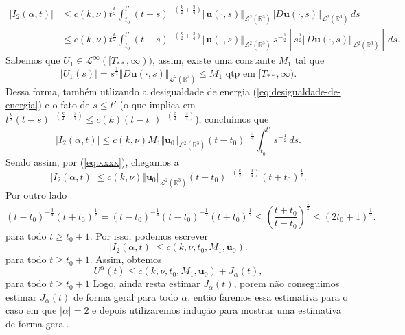 \documentclass[a4paper, 11pt]{book}
\theoremstyle{definition}
\newcommand{\bR}{\mathbb{R}}
\newcommand{\bu}{\mathbf{u}}
\newcommand{\cL}{\mathcal{L}}
\begin{document}
\begin{prf}
    \[
        \begin{aligned}
            |I_2(\alpha,t)| &\leqslant c(k,\nu) t^{\frac{k}{2}} \! \int_{t_0}^{t'} (t-s)^{-\left( \frac{k}{2} + \frac{3}{4} \right)} \Vert \bu(\cdot,s) \Vert_{\cL^2(\bR^3)} \Vert D\bu(\cdot,s) \Vert_{\cL^2(\bR^3)} \,ds\\
            &\leqslant c(k,\nu)t^{\frac{k}{2}} \!\int_{t_0}^{t'} (t-s)^{-\left( \frac{k}{2} + \frac{3}{4} \right)} \Vert \bu(\cdot,s) \Vert_{\cL^2(\bR^3)} \, s^{-\frac{1}{2}} \left[ s^{\frac{1}{2}} \Vert D\bu(\cdot,s) \Vert_{\cL^2(\bR^3)} \right] \,ds.
        \end{aligned}
    \]
    Sabemos que $U_1 \in \cL^\infty([T_{**},\infty))$, assim, existe uma constante $M_1$ tal que
    \begin{equation} \label{eq:C1}
        |U_1(s)| = s^{\frac{1}{2}} \Vert D\bu(\cdot,s) \Vert_{\cL^2(\bR^3)} \leqslant M_1 \text{ qtp em } [T_{**},\infty).
    \end{equation}
    Dessa forma, também utlizando a desigualdade de energia (\ref{eq:desigualdade-de-energia}) e o fato de $s \leqslant t'$ (o que implica em $t^{\frac{k}{2}}(t-s)^{-\left( \frac{k}{2} + \frac{3}{4} \right)} \leqslant c(k)(t-t_0)^{-\left( \frac{k}{2} + \frac{3}{4} \right)}$), concluímos que
    \[
        |I_2(\alpha,t)|\leqslant c(k,\nu) M_1 \Vert \bu_0 \Vert_{\cL^2(\bR^3)} (t-t_0)^{-\frac{3}{4}} \int_{t_0}^{t'} s^{-\frac{1}{2}} \,ds.
    \]
    Sendo assim, por (\ref{eq:xxxx}), chegamos a
    \[
        |I_2(\alpha,t)|\leqslant c(k,\nu) \Vert \bu_0 \Vert_{\cL^2(\bR^3)} (t-t_0)^{-\left( \frac{k}{2} + \frac{3}{4} \right)} (t + t_0)^{\frac{1}{2}}.
    \]
    Por outro lado
    \[
        (t - t_0)^{-\frac{3}{4}} (t + t_0)^{\frac{1}{2}} = (t - t_0)^{-\frac{1}{4}} (t - t_0)^{-\frac{1}{2}} (t + t_0)^{\frac{1}{2}} \leqslant \left( \frac{t + t_0}{t- t_0} \right)^{\frac{1}{2}} \leqslant (2t_0 + 1)^{\frac{1}{2}}.
    \]
    para todo $t \geqslant t_0 + 1$.
    Por isso, podemos escrever
    \begin{equation} \label{eq:W2}
        |I_2(\alpha,t)|\leqslant c(k,\nu, t_0, M_1, \bu_0).
    \end{equation}
    para todo $t \geqslant t_0 + 1$.
    Assim, obtemos
    \begin{equation} \label{eq:4.10}
        U^\alpha(t) \leqslant c(k,\nu,t_0,M_1,\bu_0) + J_\alpha(t),
    \end{equation}
    para todo $t \geqslant t_0 + 1$
    Logo, ainda resta estimar $J_\alpha(t)$, porem não conseguimos estimar $J_\alpha(t)$ de forma geral para todo $\alpha$, então faremos essa estimativa para o caso em que $|\alpha| = 2$ e depois utilizaremos indução para mostrar uma estimativa de forma geral.

\end{prf}
\end{document}

